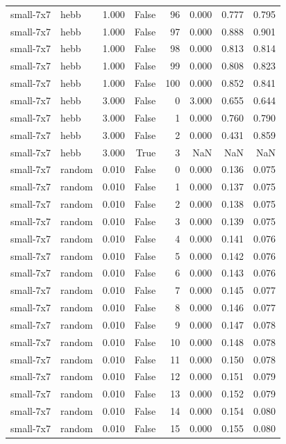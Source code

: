 \begin{tabular}{llrrrrrr}
small-7x7 & hebb & 1.000 & False & 96 & 0.000 & 0.777 & 0.795 \\
small-7x7 & hebb & 1.000 & False & 97 & 0.000 & 0.888 & 0.901 \\
small-7x7 & hebb & 1.000 & False & 98 & 0.000 & 0.813 & 0.814 \\
small-7x7 & hebb & 1.000 & False & 99 & 0.000 & 0.808 & 0.823 \\
small-7x7 & hebb & 1.000 & False & 100 & 0.000 & 0.852 & 0.841 \\
small-7x7 & hebb & 3.000 & False & 0 & 3.000 & 0.655 & 0.644 \\
small-7x7 & hebb & 3.000 & False & 1 & 0.000 & 0.760 & 0.790 \\
small-7x7 & hebb & 3.000 & False & 2 & 0.000 & 0.431 & 0.859 \\
small-7x7 & hebb & 3.000 & True & 3 & NaN & NaN & NaN \\
small-7x7 & random & 0.010 & False & 0 & 0.000 & 0.136 & 0.075 \\
small-7x7 & random & 0.010 & False & 1 & 0.000 & 0.137 & 0.075 \\
small-7x7 & random & 0.010 & False & 2 & 0.000 & 0.138 & 0.075 \\
small-7x7 & random & 0.010 & False & 3 & 0.000 & 0.139 & 0.075 \\
small-7x7 & random & 0.010 & False & 4 & 0.000 & 0.141 & 0.076 \\
small-7x7 & random & 0.010 & False & 5 & 0.000 & 0.142 & 0.076 \\
small-7x7 & random & 0.010 & False & 6 & 0.000 & 0.143 & 0.076 \\
small-7x7 & random & 0.010 & False & 7 & 0.000 & 0.145 & 0.077 \\
small-7x7 & random & 0.010 & False & 8 & 0.000 & 0.146 & 0.077 \\
small-7x7 & random & 0.010 & False & 9 & 0.000 & 0.147 & 0.078 \\
small-7x7 & random & 0.010 & False & 10 & 0.000 & 0.148 & 0.078 \\
small-7x7 & random & 0.010 & False & 11 & 0.000 & 0.150 & 0.078 \\
small-7x7 & random & 0.010 & False & 12 & 0.000 & 0.151 & 0.079 \\
small-7x7 & random & 0.010 & False & 13 & 0.000 & 0.152 & 0.079 \\
small-7x7 & random & 0.010 & False & 14 & 0.000 & 0.154 & 0.080 \\
small-7x7 & random & 0.010 & False & 15 & 0.000 & 0.155 & 0.080 \\

\end{tabular}
